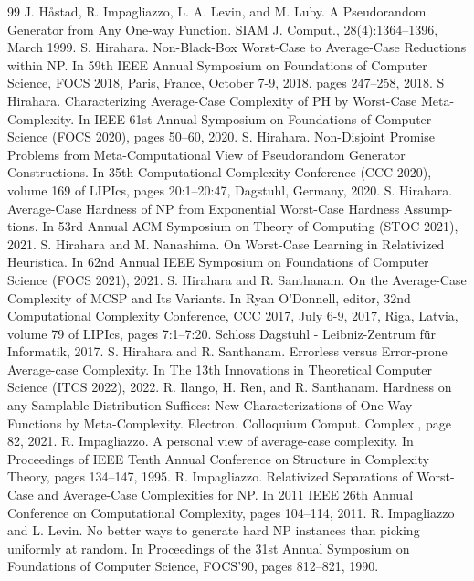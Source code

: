 \begin{thebibliography}{99}
 J. Håstad, R. Impagliazzo, L. A. Levin, and M. Luby. A Pseudorandom Generator from Any One-way Function. SIAM J. Comput., 28(4):1364–1396, March 1999.
 S. Hirahara. Non-Black-Box Worst-Case to Average-Case Reductions within NP. In 59th IEEE Annual Symposium on Foundations of Computer Science, FOCS 2018, Paris, France, October 7-9, 2018, pages 247–258, 2018.
 S Hirahara. Characterizing Average-Case Complexity of PH by Worst-Case Meta-Complexity. In IEEE 61st Annual Symposium on Foundations of Computer Science (FOCS 2020), pages 50–60, 2020.
 S. Hirahara. Non-Disjoint Promise Problems from Meta-Computational View of Pseudorandom Generator Constructions. In 35th Computational Complexity Conference (CCC 2020), volume 169 of LIPIcs, pages 20:1–20:47, Dagstuhl, Germany, 2020.
 S. Hirahara. Average-Case Hardness of NP from Exponential Worst-Case Hardness Assump- tions. In 53rd Annual ACM Symposium on Theory of Computing (STOC 2021), 2021.
 S. Hirahara and M. Nanashima. On Worst-Case Learning in Relativized Heuristica. In 62nd Annual IEEE Symposium on Foundations of Computer Science (FOCS 2021), 2021.
 S. Hirahara and R. Santhanam. On the Average-Case Complexity of MCSP and Its Variants. In Ryan O’Donnell, editor, 32nd Computational Complexity Conference, CCC 2017, July 6-9, 2017, Riga, Latvia, volume 79 of LIPIcs, pages 7:1–7:20. Schloss Dagstuhl - Leibniz-Zentrum für Informatik, 2017.
 S. Hirahara and R. Santhanam. Errorless versus Error-prone Average-case Complexity. In The 13th Innovations in Theoretical Computer Science (ITCS 2022), 2022.
 R. Ilango, H. Ren, and R. Santhanam. Hardness on any Samplable Distribution Suffices: New Characterizations of One-Way Functions by Meta-Complexity. Electron. Colloquium Comput. Complex., page 82, 2021.
 R. Impagliazzo. A personal view of average-case complexity. In Proceedings of IEEE Tenth Annual Conference on Structure in Complexity Theory, pages 134–147, 1995.
 R. Impagliazzo. Relativized Separations of Worst-Case and Average-Case Complexities for NP. In 2011 IEEE 26th Annual Conference on Computational Complexity, pages 104–114, 2011.
 R. Impagliazzo and L. Levin. No better ways to generate hard NP instances than picking uniformly at random. In Proceedings of the 31st Annual Symposium on Foundations of Computer Science, FOCS’90, pages 812–821, 1990.

\end{thebibliography}
